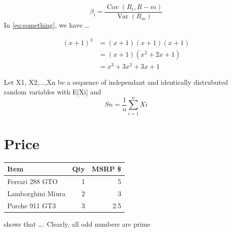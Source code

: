 \documentclass{article}
\begin{document}
\begin{equation*} %
\beta_i = 
\frac{\operatorname{Cov} (R_i, R-m)}
	{\operatorname{Var} (R_m)}
\end{equation*} 
In \eqref{eq:something}, we have \ldots


\begin{align*}
(x+1)^3 &= (x+1)(x+1)(x+1) \\
&= (x+1)(x^2 + 2x + 1) \\
&= x^3 + 3x^2 + 3x + 1
\end{align*}

Let X{1}, X{2},...,Xn be a sequence of independant and identically distrubuted random variables with E[X{i}] and 
\begin{equation*}
S{n}=
\frac{1}
	{n}
\sum_{i=1}^{n} X{i}
\end{equation*}


\section {Price}

\begin{tabular}{|l|r|r|} \hline%
Item                       & Qty      &     MSRP \$ \\\hline
Ferrari 288 GTO      & 1         &      5     \\\hline

Lamborghini Miura   &2          &      3      \\

Porche 911 GT3       &3          &      2.5    \\\hline
\end{tabular}
\cite{Brooks1997Methodology}
shows that \ldots. Clearly,
all odd numbers are prime


\end{document}
